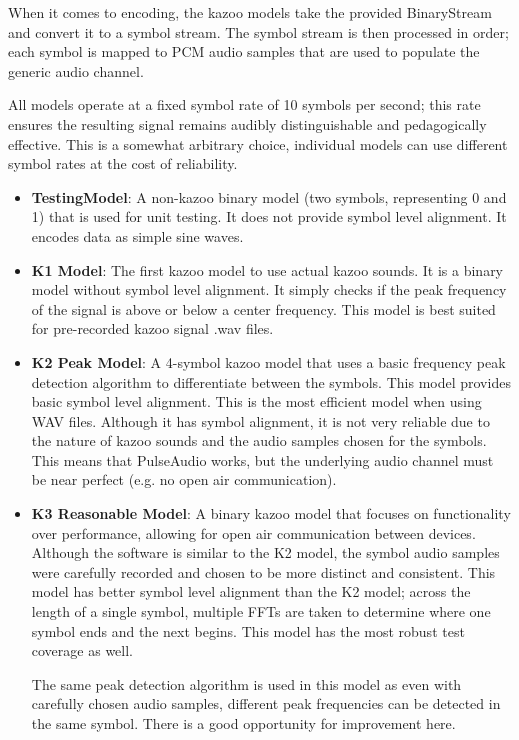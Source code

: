 \documentclass[]{article}
\begin{document}
When it comes to encoding, the kazoo models take the provided BinaryStream and convert it to a symbol stream. The symbol stream is then processed in order; each symbol is mapped to PCM audio samples that are used to populate the generic audio channel.

All models operate at a fixed symbol rate of 10 symbols per second; this rate ensures the resulting signal remains audibly distinguishable and pedagogically effective. This is a somewhat arbitrary choice, individual models can use different symbol rates at the cost of reliability.

\begin{itemize}
  \item \textbf{TestingModel}: A non-kazoo binary model (two symbols, representing 0 and 1) that is used for unit testing. It does not provide symbol level alignment. It encodes data as simple sine waves.

  \item \textbf{K1 Model}: The first kazoo model to use actual kazoo sounds. It is a binary model without symbol level alignment. It simply checks if the peak frequency of the signal is above or below a center frequency. This model is best suited for pre-recorded kazoo signal .wav files.

  \item \textbf{K2 Peak Model}: A 4-symbol kazoo model that uses a basic frequency peak detection algorithm to differentiate between the symbols. This model provides basic symbol level alignment. This is the most efficient model when using WAV files. Although it has symbol alignment, it is not very reliable due to the nature of kazoo sounds and the audio samples chosen for the symbols. This means that PulseAudio works, but the underlying audio channel must be near perfect (e.g. no open air communication).

  \item \textbf{K3 Reasonable Model}: A binary kazoo model that focuses on functionality over performance, allowing for open air communication between devices. Although the software is similar to the K2 model, the symbol audio samples were carefully recorded and chosen to be more distinct and consistent. This model has better symbol level alignment than the K2 model; across the length of a single symbol, multiple FFTs are taken to determine where one symbol ends and the next begins. This model has the most robust test coverage as well.

  The same peak detection algorithm is used in this model as even with carefully chosen audio samples, different peak frequencies can be detected in the same symbol. There is a good opportunity for improvement here.
\end{itemize}
\end{document}
